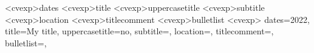 \newcommand{\datesstyle}[1]{
    \textbf{#1}
}

\newcommand{\titlestyle}[1]{
    \textcolor{hltxt}{\textbf{#1}}
}

\newcommand{\subtitlestyle}[1]{
    \ifthenelse{\equal{#1}{}}
    {
        \vspace{-\baselineskip}
    }{\textcolor{subhltxt}{\textit{\textbf{#1}}}}
}

\newcommand{\locationstyle}[1]{
    \ifthenelse{\equal{#1}{}}
    {}{\textit{#1}}
}

\newcommand{\titlecommentstyle}[1]{
    \ifthenelse{\equal{#1}{}}
    {
        \vspace{-\baselineskip}
    }{(#1)}
}

\newcommand{\bulletliststyle}[1]{
    \ifthenelse{\equal{#1}{}}{}{
        \vspace{\vspacebulletvalue}
        \readlist\mylist{#1}%
        \begin{itemize} 
            \foreachitem\z\in\mylist[]{
                \item \z
            }
        \end{itemize}
        \bulletpadding
    }
}



\DeclareOptionX<cvexp>{dates}{\def\dates{#1}}
\DeclareOptionX<cvexp>{title}{\def\title{#1}}
\DeclareOptionX<cvexp>{uppercasetitle}{\def\uppercasetitle{#1}}
\DeclareOptionX<cvexp>{subtitle}{\def\subtitle{#1}}
\DeclareOptionX<cvexp>{location}{\def\location{#1}}
\DeclareOptionX<cvexp>{titlecomment}{\def\titlecomment{#1}}
\DeclareOptionX<cvexp>{bulletlist}{\def\bulletlist{#1}}
\ExecuteOptionsX<cvexp>{
    dates=2022,
    title=My title,
    uppercasetitle=no,
    subtitle=,
    location=,
    titlecomment=,
    bulletlist={},
}


